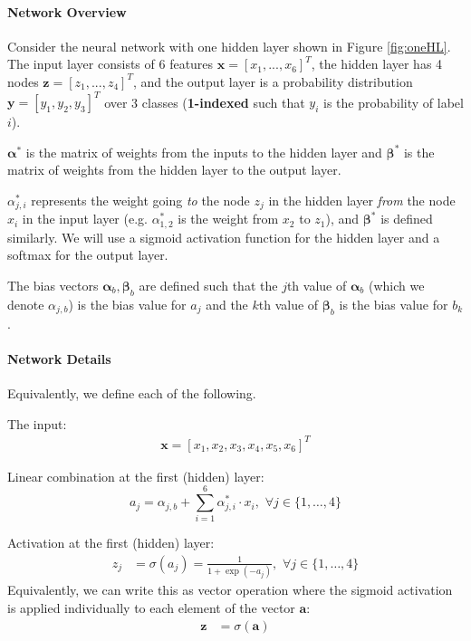\documentclass[11pt,addpoints,answers]{exam}
\newcommand{\av}{\mathbf{a}}
\newcommand{\xv}{\mathbf{x}}
\newcommand{\yv}{\mathbf{y}}
\newcommand{\zv}{\mathbf{z}}
\newcommand{\alphav     }{\boldsymbol \alpha     }
\newcommand{\betav      }{\boldsymbol \beta      }
\begin{document}
\begin{questions}
\paragraph{Network Overview}
Consider the neural network with one hidden layer shown in Figure \ref{fig:oneHL}. The input layer consists of 6 features $\xv = [x_1,...,x_6]^T$, the hidden layer has 4  nodes $\zv = [z_1,...,z_4]^T$, and the output layer is a probability distribution $\yv = [y_1, y_2, y_3]^T$ over 3 classes (\textbf{1-indexed} such that $y_i$ is the probability of label $i$).

$\alphav^*$ is the matrix of weights from the inputs to the hidden layer and $\betav^*$ is the matrix of weights from the hidden layer to the output layer. 

$\alpha^*_{j,i}$ represents the weight going \textit{to} the node $z_j$ in the hidden layer \textit{from} the node $x_i$ in the input layer (e.g. $\alpha^*_{1,2}$ is the weight from $x_2$ to $z_1$), and $\betav^*$ is defined similarly. We will use a sigmoid activation function for the hidden layer and a softmax for the output layer.

The bias vectors $\alphav_b, \betav_b$ are defined such that the $j$th value of $\alphav_b$ (which we denote $\alpha_{j, b}$) is the bias value for $a_j$ and the $k$th value of $\betav_b$ is the bias value for $b_k$.

\clearpage

\paragraph{Network Details}

Equivalently, we define each of the following. 

The input:
\begin{align}
\label{eqn:x}
\xv=[x_1,x_2,x_3,x_4,x_5,x_6]^T
\end{align}

Linear combination at the first (hidden) layer:
\begin{equation}
\label{eqn:a}
a_j= \alpha_{j, b} + \sum_{i=1}^6 \alpha^*_{j,i}\cdot x_i,\,\, \forall j \in \{1,\ldots,4\}
\end{equation}

Activation at the first (hidden) layer:
\begin{align}
\label{eqn:z}
z_j &= \sigma(a_j) = \frac{1}{1+\exp(-a_j)},\,\, \forall j \in \{1,\ldots,4\}
\end{align}
Equivalently, we can write this as vector operation where the sigmoid activation is applied individually to each element of the vector $\av$:
\begin{align}
\label{eqn:zv}
\zv &= \sigma(\av)
\end{align}


\end{questions}
\end{document}
